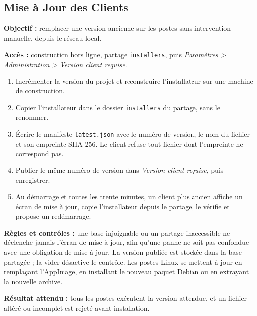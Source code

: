 \subsection{Mise à Jour des Clients}
\textbf{Objectif :} remplacer une version ancienne sur les postes sans intervention manuelle, depuis le
réseau local.\par
\textbf{Accès :} construction hors ligne, partage \texttt{installers}, puis \emph{Paramètres >
Administration > Version client requise}.\par
\begin{enumerate}
    \item Incrémenter la version du projet et reconstruire l'installateur sur une machine de
          construction.
    \item Copier l'installateur dans le dossier \texttt{installers} du partage, sans le renommer.
    \item Écrire le manifeste \texttt{latest.json} avec le numéro de version, le nom du fichier et son
          empreinte SHA-256. Le client refuse tout fichier dont l'empreinte ne correspond pas.
    \item Publier le même numéro de version dans \emph{Version client requise}, puis enregistrer.
    \item Au démarrage et toutes les trente minutes, un client plus ancien affiche un écran de mise à
          jour, copie l'installateur depuis le partage, le vérifie et propose un redémarrage.
\end{enumerate}
\textbf{Règles et contrôles :} une base injoignable ou un partage inaccessible ne déclenche jamais
l'écran de mise à jour, afin qu'une panne ne soit pas confondue avec une obligation de mise à jour. La
version publiée est stockée dans la base partagée ; la vider désactive le contrôle. Les postes Linux se
mettent à jour en remplaçant l'AppImage, en installant le nouveau paquet Debian ou en extrayant la
nouvelle archive.\par
\textbf{Résultat attendu :} tous les postes exécutent la version attendue, et un fichier altéré ou
incomplet est rejeté avant installation.

